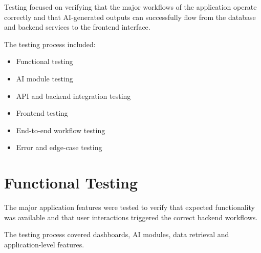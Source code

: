 \documentclass[12pt,a4paper]{report}
\begin{document}
Testing focused on verifying that the major workflows of the application
operate correctly and that AI-generated outputs can successfully flow
from the database and backend services to the frontend interface.

The testing process included:

\begin{itemize}
    \item Functional testing
    \item AI module testing
    \item API and backend integration testing
    \item Frontend testing
    \item End-to-end workflow testing
    \item Error and edge-case testing
\end{itemize}



\section{Functional Testing}

The major application features were tested to verify that expected
functionality was available and that user interactions triggered the
correct backend workflows.

The testing process covered dashboards, AI modules, data retrieval and
application-level features.
\end{document}
